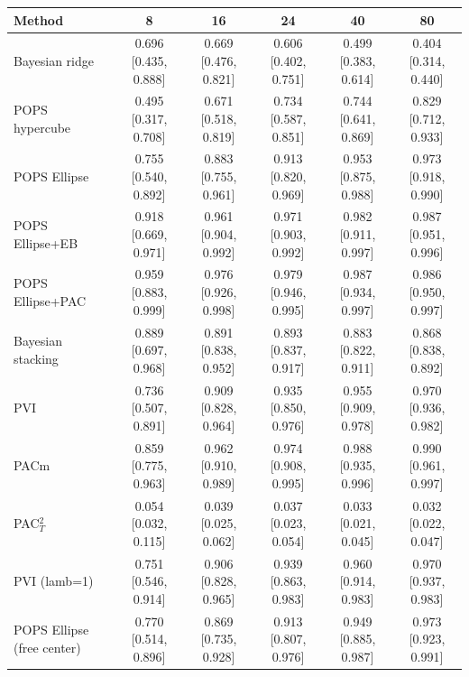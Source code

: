 \begin{tabular}{lccccc}
\toprule
Method & 8 & 16 & 24 & 40 & 80 \\
\midrule
Bayesian ridge & 0.696 {\scriptsize[0.435, 0.888]} & 0.669 {\scriptsize[0.476, 0.821]} & 0.606 {\scriptsize[0.402, 0.751]} & 0.499 {\scriptsize[0.383, 0.614]} & 0.404 {\scriptsize[0.314, 0.440]} \\
POPS hypercube & 0.495 {\scriptsize[0.317, 0.708]} & 0.671 {\scriptsize[0.518, 0.819]} & 0.734 {\scriptsize[0.587, 0.851]} & 0.744 {\scriptsize[0.641, 0.869]} & 0.829 {\scriptsize[0.712, 0.933]} \\
POPS Ellipse & 0.755 {\scriptsize[0.540, 0.892]} & 0.883 {\scriptsize[0.755, 0.961]} & 0.913 {\scriptsize[0.820, 0.969]} & 0.953 {\scriptsize[0.875, 0.988]} & 0.973 {\scriptsize[0.918, 0.990]} \\
POPS Ellipse+EB & 0.918 {\scriptsize[0.669, 0.971]} & 0.961 {\scriptsize[0.904, 0.992]} & 0.971 {\scriptsize[0.903, 0.992]} & 0.982 {\scriptsize[0.911, 0.997]} & 0.987 {\scriptsize[0.951, 0.996]} \\
POPS Ellipse+PAC & 0.959 {\scriptsize[0.883, 0.999]} & 0.976 {\scriptsize[0.926, 0.998]} & 0.979 {\scriptsize[0.946, 0.995]} & 0.987 {\scriptsize[0.934, 0.997]} & 0.986 {\scriptsize[0.950, 0.997]} \\
Bayesian stacking & 0.889 {\scriptsize[0.697, 0.968]} & 0.891 {\scriptsize[0.838, 0.952]} & 0.893 {\scriptsize[0.837, 0.917]} & 0.883 {\scriptsize[0.822, 0.911]} & 0.868 {\scriptsize[0.838, 0.892]} \\
PVI & 0.736 {\scriptsize[0.507, 0.891]} & 0.909 {\scriptsize[0.828, 0.964]} & 0.935 {\scriptsize[0.850, 0.976]} & 0.955 {\scriptsize[0.909, 0.978]} & 0.970 {\scriptsize[0.936, 0.982]} \\
PACm & 0.859 {\scriptsize[0.775, 0.963]} & 0.962 {\scriptsize[0.910, 0.989]} & 0.974 {\scriptsize[0.908, 0.995]} & 0.988 {\scriptsize[0.935, 0.996]} & 0.990 {\scriptsize[0.961, 0.997]} \\
PAC$^2_T$ & 0.054 {\scriptsize[0.032, 0.115]} & 0.039 {\scriptsize[0.025, 0.062]} & 0.037 {\scriptsize[0.023, 0.054]} & 0.033 {\scriptsize[0.021, 0.045]} & 0.032 {\scriptsize[0.022, 0.047]} \\
PVI (lamb=1) & 0.751 {\scriptsize[0.546, 0.914]} & 0.906 {\scriptsize[0.828, 0.965]} & 0.939 {\scriptsize[0.863, 0.983]} & 0.960 {\scriptsize[0.914, 0.983]} & 0.970 {\scriptsize[0.937, 0.983]} \\
POPS Ellipse (free center) & 0.770 {\scriptsize[0.514, 0.896]} & 0.869 {\scriptsize[0.735, 0.928]} & 0.913 {\scriptsize[0.807, 0.976]} & 0.949 {\scriptsize[0.885, 0.987]} & 0.973 {\scriptsize[0.923, 0.991]} \\

\end{tabular}
